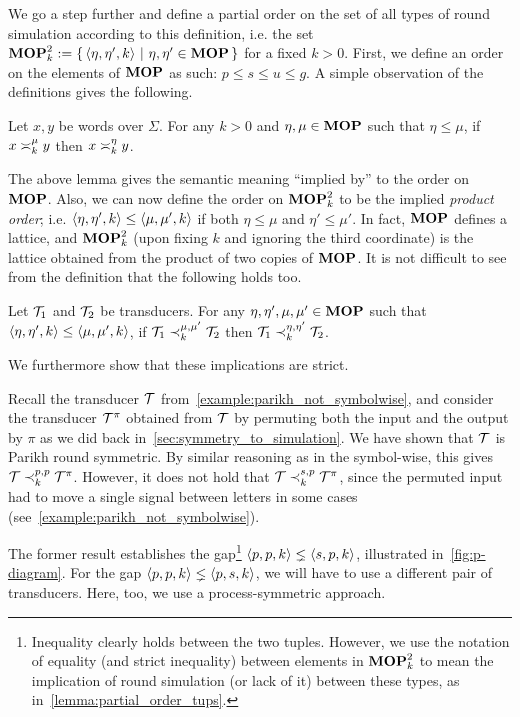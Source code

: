 We go a step further and define a partial order on the set of all types of round simulation according to this definition, i.e. the set $\RSTUPS:=\condset{\tup{\eta, \eta', k}}{\eta,\eta'\in \RSTYPES}$ for a fixed $k>0$. First, we define an order on the elements of $\RSTYPES$ as such: $p\leq s\leq u\leq g$. A simple observation of the definitions gives the following.

\begin{lemma}
    Let $x,y$ be words over $\Sigma$. For any $k>0$ and $\eta,\mu\in\RSTYPES$ such that $\eta\leq \mu$, if $x\req[k]^\mu y$ then $x\req[k]^\eta y$.
\end{lemma}

The above lemma gives the semantic meaning ``implied by'' to the order on $\RSTYPES$. Also, we can now define the order on $\RSTUPS$ to be the implied \emph{product order}; i.e. $\tup{\eta, \eta', k}\leq \tup{\mu, \mu', k}$ if both $\eta\leq \mu$ and $\eta'\leq \mu'$. In fact, $\RSTYPES$ defines a lattice, and $\RSTUPS$ (upon fixing $k$ and ignoring the third coordinate) is the lattice obtained from the product of two copies of $\RSTYPES$. It is not difficult to see from the definition that the following holds too.

\begin{lemma}
\label{lemma:partial_order_tups}
        Let $\cT_1$ and $\cT_2$ be transducers. For any $\eta,\eta',\mu,\mu'\in\RSTYPES$ such that $\tup{\eta,\eta',k}\leq \tup{\mu,\mu',k}$, if $\cT_1 \prec_{k}^{\mu,\mu'} \cT_2$ then $\cT_1 \prec_{k}^{\eta,\eta'} \cT_2$.
\end{lemma}
We furthermore show that these implications are strict.

Recall the transducer $\cT$ from~\cref{example:parikh_not_symbolwise}, and consider the transducer $\cT^\pi$ obtained from $\cT$ by permuting both the input and the output by $\pi$ as we did back in~\cref{sec:symmetry_to_simulation}. We have shown that $\cT$ is Parikh round symmetric. By similar reasoning as in the symbol-wise, this gives $\cT\prec^{p,p}_k \cT^\pi$. However, it does not hold that $\cT\prec^{s,p}_k \cT^\pi$, since the permuted input had to move a single signal between letters in some cases (see~\cref{example:parikh_not_symbolwise}).

The former result establishes the gap\footnote{Inequality clearly holds between the two tuples. However, we use the notation of equality (and strict inequality) between elements in $\RSTUPS$ to mean the implication of round simulation (or lack of it) between these types, as in~\cref{lemma:partial_order_tups}.} $\tup{p, p, k}\lneq\tup{s, p, k}$, illustrated in~\cref{fig:p-diagram}. For the gap $\tup{p, p, k}\lneq\tup{p, s, k}$, we will have to use a different pair of transducers. Here, too, we use a process-symmetric approach.


